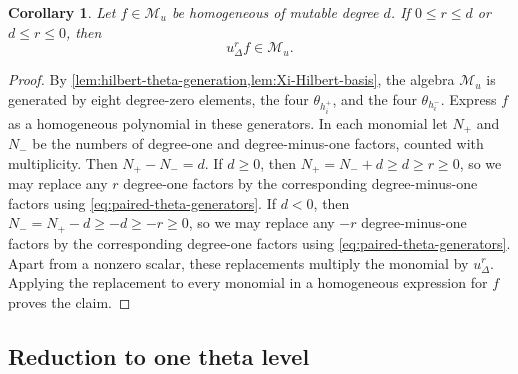 \documentclass[11pt,reqno]{amsart}
\numberwithin{equation}{section}
\newtheorem{lemma}[lemma]{Lemma}
\newtheorem{corollary}[corollary]{Corollary}
\theoremstyle{remark}
\newcommand{\Mu}{\mathcal M_u}
\newcommand{\udisc}{u_{\Delta}}
\begin{document}


\begin{corollary}
\label{cor:multiplication-by-discriminant}
Let $f\in\Mu$ be homogeneous of mutable degree $d$.  If
$0\le r\le d$ or $d \le r \le 0$, then
\[ \udisc^rf\in\Mu. \]
\end{corollary}
\begin{proof}
By \cref{lem:hilbert-theta-generation,lem:Xi-Hilbert-basis}, the algebra
$\Mu$ is generated by eight degree-zero elements, the four
$\theta_{h_i^+}$, and the four $\theta_{h_i^-}$.  Express $f$ as a
homogeneous polynomial in these generators.  In each monomial let $N_+$ and
$N_-$ be the numbers of degree-one and degree-minus-one factors, counted with
multiplicity. Then $N_+ - N_-=d$. If $d \ge 0$, then $N_+ = N_- + d \ge d\ge r \ge 0$, so we may replace any $r$ degree-one factors by the corresponding degree-minus-one factors using
\eqref{eq:paired-theta-generators}.
If $d < 0$, then $N_- = N_+ - d \ge - d \ge -r \ge 0$, so we may replace any $-r$ degree-minus-one factors by
the corresponding degree-one factors using
\eqref{eq:paired-theta-generators}.
Apart from a nonzero scalar, these replacements
multiply the monomial by $\udisc^r$.  Applying the replacement to every
monomial in a homogeneous expression for $f$ proves the claim.
\end{proof}



\subsection{Reduction to one theta level}
\end{document}
